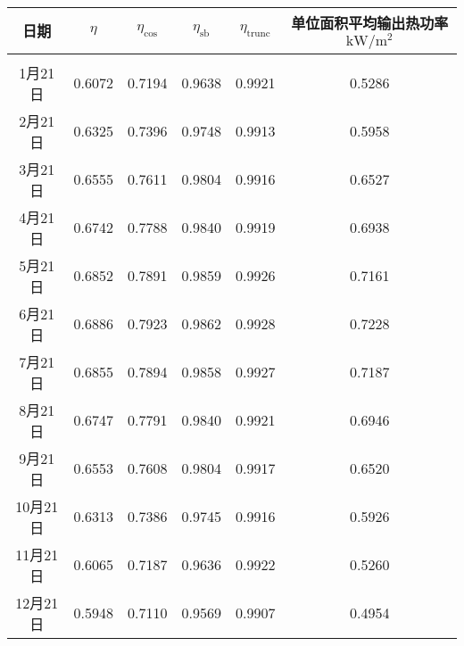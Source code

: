 \begin{tabular}{|c|ccccc|}
\hline
日期 & \(\eta\) & \(\eta _{\cos}\) & \(\eta _{\mathrm{s b}}\) & \(\eta _{\mathrm{trunc}}\) & 单位面积平均输出热功率\(\mathrm{kW}/\mathrm{m}^{2}\)\\
\hline
\\[-1em]
1月21日  & 0.6072 & 0.7194 & 0.9638 & 0.9921 & 0.5286\\
2月21日  & 0.6325 & 0.7396 & 0.9748 & 0.9913 & 0.5958\\
3月21日  & 0.6555 & 0.7611 & 0.9804 & 0.9916 & 0.6527\\
4月21日  & 0.6742 & 0.7788 & 0.9840 & 0.9919 & 0.6938\\
5月21日  & 0.6852 & 0.7891 & 0.9859 & 0.9926 & 0.7161\\
6月21日  & 0.6886 & 0.7923 & 0.9862 & 0.9928 & 0.7228\\
7月21日  & 0.6855 & 0.7894 & 0.9858 & 0.9927 & 0.7187\\
8月21日  & 0.6747 & 0.7791 & 0.9840 & 0.9921 & 0.6946\\
9月21日  & 0.6553 & 0.7608 & 0.9804 & 0.9917 & 0.6520\\
10月21日 & 0.6313 & 0.7386 & 0.9745 & 0.9916 & 0.5926\\
11月21日 & 0.6065 & 0.7187 & 0.9636 & 0.9922 & 0.5260\\
12月21日 & 0.5948 & 0.7110 & 0.9569 & 0.9907 & 0.4954\\
\hline
\end{tabular}
